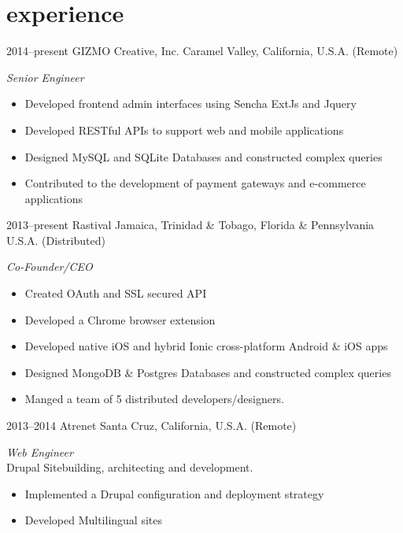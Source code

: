 \documentclass[]{friggeri-cv} %
\begin{document}

\section{experience}

\begin{entrylist}

\entry
{2014--present}
{GIZMO Creative, Inc.}
{Caramel Valley, California, U.S.A. (Remote)}
{\emph{Senior Engineer} \\
\begin{itemize}
\item Developed frontend admin interfaces using Sencha ExtJs and Jquery
\item Developed RESTful APIs to support web and mobile applications
\item Designed MySQL and SQLite Databases and constructed complex queries
\item Contributed to the development of payment gateways and e-commerce applications
\end{itemize}}
\entry
{2013--present}
{Rastival}
{Jamaica, Trinidad \& Tobago, Florida \& Pennsylvania U.S.A. (Distributed)}
{\emph{Co-Founder/CEO} \\
\begin{itemize}
\item Created OAuth and SSL secured API
\item Developed a Chrome browser extension
\item Developed native iOS and hybrid Ionic cross-platform Android \& iOS apps
\item Designed MongoDB \& Postgres Databases and constructed complex queries
\item Manged a team of 5 distributed developers/designers.
\end{itemize}}
\entry
{2013--2014}
{Atrenet}
{Santa Cruz, California, U.S.A. (Remote)}
{\emph{Web Engineer} \\
Drupal Sitebuilding, architecting and development.
\begin{itemize}
\item Implemented a Drupal configuration and deployment strategy
\item Developed Multilingual sites

\end{itemize}}
\end{entrylist}
\end{document}
